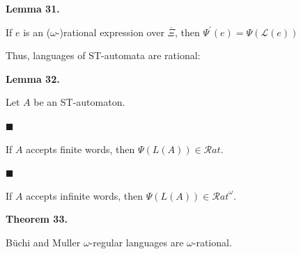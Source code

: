 \documentclass[10pt,a4paper]{article}
\begin{document}
 
 
\par\medskip\noindent\textbf{Lemma 31.}\par
 
 
If $e$ is an ($\omega$-)rational expression over $\overline{\Xi}$, then $\Psi^{\prime}(e)=\Psi(\mathcal{L}(e))$\par
 
 
 
 
Thus, languages of ST-automata are rational:\par
 
 
 
\par\medskip\noindent\textbf{Lemma 32.}\par
 
 
Let $A$ be an ST-automaton.\par
  
\par\noindent  $\blacksquare$ 
 
If $A$ accepts finite words, then $\Psi(L(A))\in\mathcal{R}at$.\par
 
 
 
\par\noindent  $\blacksquare$ 
 
If $A$ accepts infinite words, then $\Psi(L(A))\in{\mathcal{R}at}^{\omega}$.\par
 
 
  
 
 

 
\par\medskip\noindent\textbf{Theorem 33.}\par
 
 
Büchi and Muller $\omega$-regular languages are $\omega$-rational.\par
 
\end{document}
